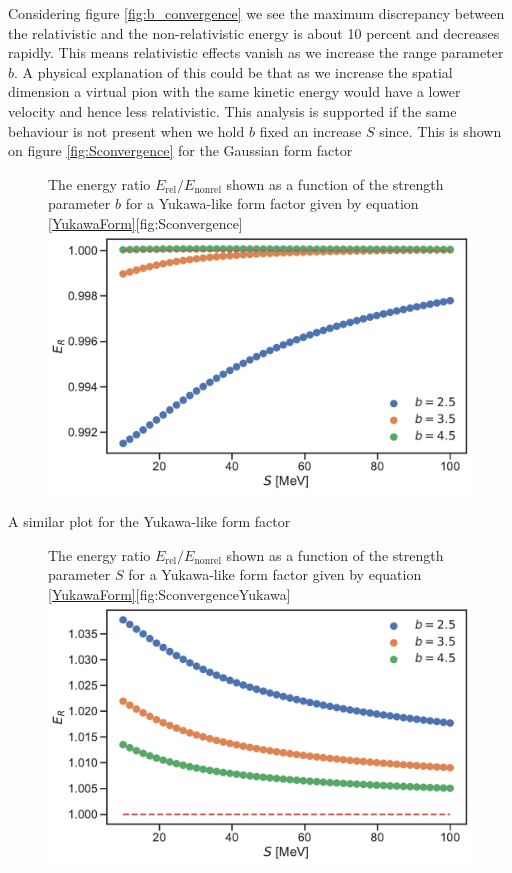 Considering figure \ref{fig:b_convergence} we see the maximum discrepancy between the relativistic and the non-relativistic energy is about 10 percent and decreases rapidly. This means relativistic effects vanish as we increase the range parameter $b$. A physical explanation of this could be that as we increase the spatial dimension a virtual pion with the same kinetic energy would have a lower velocity and hence less relativistic. This analysis is supported if the same behaviour is not present when we hold $b$ fixed an increase $S$ since. This is shown on figure \ref{fig:Sconvergence} for the Gaussian form factor 
\begin{figure}[H]
	\begin{sidecaption}{The energy ratio $E_\text{rel}/E_\text{nonrel}$ shown as a function of the strength parameter $b$ for a Yukawa-like form factor given by equation \eqref{YukawaForm}}[fig:Sconvergence]
		\includegraphics[width=\linewidth]{Figures/Sconvergence.pdf}
	\end{sidecaption}
\end{figure}
A similar plot for the Yukawa-like form factor 
\begin{figure}[H]
	\begin{sidecaption}{The energy ratio $E_\text{rel}/E_\text{nonrel}$ shown as a function of the strength parameter $S$ for a Yukawa-like form factor given by equation \eqref{YukawaForm}}[fig:SconvergenceYukawa]
		\includegraphics[width=\linewidth]{Figures/SconvergenceYukawa.pdf}
	\end{sidecaption}
\end{figure}

